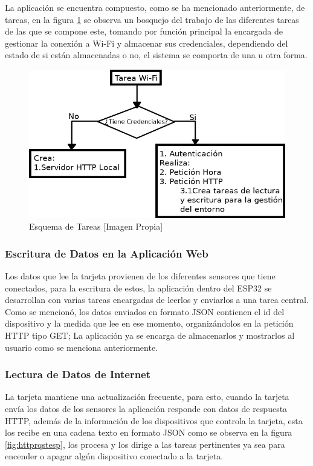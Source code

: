 La aplicación se encuentra compuesto, como se ha mencionado anteriormente, de tareas, en la figura \ref{fig:tareas} se observa un bosquejo del trabajo de las diferentes tareas de las que se compone este, tomando por función principal la encargada de gestionar la conexión a Wi-Fi y almacenar sus credenciales, dependiendo del estado de si están almacenadas o no, el sistema se comporta de una u otra forma.\\

\begin{figure}[!t]
	\centering
	\caption{Esquema de Tareas [Imagen Propia]}
	\label{fig:tareas}
	\includegraphics[width=0.7\linewidth]{Imagenes/tareas}
\end{figure}

\subsubsection*{Escritura de Datos en la Aplicación Web}

Los datos que lee la tarjeta provienen de los diferentes sensores que tiene conectados, para la escritura de estos, la aplicación dentro del ESP32 se desarrollan con varias tareas encargadas de leerlos y enviarlos a una tarea central. Como se mencionó, los datos enviados en formato JSON contienen el id del dispositivo y la medida que lee en ese momento, organizándolos en la petición HTTP tipo GET; La aplicación ya se encarga de almacenarlos y mostrarlos al usuario como se menciona anteriormente.\\

\subsubsection*{Lectura de Datos de Internet}

La tarjeta mantiene una actualización frecuente, para esto, cuando la tarjeta envía los datos de los sensores la aplicación responde con datos de respuesta HTTP, además de la información de los dispositivos que controla la tarjeta, esta los recibe en una cadena texto en formato JSON como se observa en la figura \ref{fig:httprqstesp}, los procesa y los dirige a las tareas pertinentes ya sea para encender o apagar algún dispositivo conectado a la tarjeta.\\

